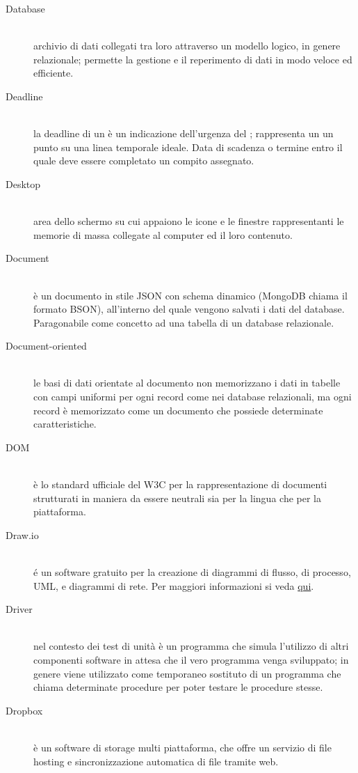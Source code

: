 \documentclass[12pt,a4paper]{article}
\begin{document}
\begin{description}
\item[Database] 
\hfill\\ archivio di dati collegati tra loro attraverso un modello logico, in genere relazionale; permette la gestione e il reperimento di dati in modo veloce ed efficiente.

\item[Deadline] 
\hfill\\ la deadline di un  è un indicazione dell'urgenza del ; rappresenta un un punto su una linea temporale ideale. Data di scadenza o termine entro il quale deve essere completato un compito assegnato.

\item[Desktop] 
\hfill\\ area dello schermo su cui appaiono le icone e le finestre rappresentanti le memorie di massa collegate al computer ed il loro contenuto.

\item[Document] 
\hfill\\è un documento in stile JSON con schema dinamico (MongoDB chiama il formato BSON), all'interno del quale vengono salvati i dati del database. Paragonabile come concetto ad una tabella di un database relazionale.

\item[Document-oriented] 
\hfill\\ le basi di dati orientate al documento non memorizzano i dati in tabelle con campi uniformi per ogni record come nei database relazionali, ma ogni record è memorizzato come un documento che possiede determinate caratteristiche.

\item[DOM] 
\hfill\\ è lo standard ufficiale del W3C per la rappresentazione di documenti strutturati in maniera da essere neutrali sia per la lingua che per la piattaforma.

\item[Draw.io] 
\hfill\\ é un software gratuito per la creazione di diagrammi di flusso, di processo, UML, e diagrammi di rete. Per maggiori informazioni si veda \href{https://www.draw.io}{qui}.

\item[Driver] 
\hfill\\ nel contesto dei test di unità è un programma che simula l'utilizzo di altri componenti software in attesa che il vero programma venga sviluppato; in genere viene utilizzato come temporaneo sostituto di un programma che chiama determinate procedure per poter testare le procedure stesse.

\item[Dropbox] 
\hfill\\ è un software di  storage multi piattaforma, che offre un servizio di file hosting e sincronizzazione automatica di file tramite web.
\end{description}
\end{document}
